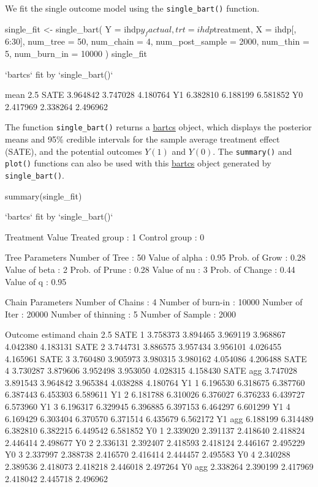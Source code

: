 We fit the single outcome model using the \verb|single_bart()| function.
\begin{example}
single_fit <- single_bart(
  Y               = ihdp$y_factual,
  trt             = ihdp$treatment,
  X               = ihdp[, 6:30],
  num_tree        = 50,
  num_chain       = 4,
  num_post_sample = 2000,
  num_thin        = 5,
  num_burn_in     = 10000
)
single_fit

`bartcs` fit by `single_bart()`

         mean     2.5%
SATE 3.964842 3.747028 4.180764
Y1   6.382810 6.188199 6.581852
Y0   2.417969 2.338264 2.496962
\end{example}
The function \verb|single_bart()| returns a \href{https://CRAN.R-project.org/package=bartcs}{bartcs} object, which displays the posterior means and 95\% credible intervals for the sample average treatment effect (SATE), and the potential outcomes $Y(1)$ and $Y(0)$. The \verb|summary()| and \verb|plot()| functions can also be used with this \href{https://CRAN.R-project.org/package=bartcs}{bartcs} object generated by \verb|single_bart()|.
\begin{example}
summary(single_fit)

`bartcs` fit by `single_bart()`

Treatment Value
  Treated group    :      1
  Control group    :      0

Tree Parameters
  Number of Tree   :     50		Value  of alpha    :   0.95
  Prob.  of Grow   :   0.28		Value  of beta     :      2
  Prob.  of Prune  :   0.28		Value  of nu       :      3
  Prob.  of Change :   0.44		Value  of q        :   0.95

Chain Parameters
  Number of Chains :      4		Number of burn-in  :  10000
  Number of Iter   :  20000		Number of thinning :      5
  Number of Sample :   2000

Outcome
 estimand chain     2.5%
      SATE    1 3.758373 3.894465 3.969119 3.968867 4.042380 4.183131
      SATE    2 3.744731 3.886575 3.957434 3.956101 4.026455 4.165961
      SATE    3 3.760480 3.905973 3.980315 3.980162 4.054086 4.206488
      SATE    4 3.730287 3.879606 3.952498 3.953050 4.028315 4.158430
      SATE  agg 3.747028 3.891543 3.964842 3.965384 4.038288 4.180764
       Y1     1 6.196530 6.318675 6.387760 6.387443 6.453303 6.589611
       Y1     2 6.181788 6.310026 6.376027 6.376233 6.439727 6.573960
       Y1     3 6.196317 6.329945 6.396885 6.397153 6.464297 6.601299
       Y1     4 6.169429 6.303404 6.370570 6.371514 6.435679 6.562172
       Y1   agg 6.188199 6.314489 6.382810 6.382215 6.449542 6.581852
       Y0     1 2.339020 2.391137 2.418640 2.418824 2.446414 2.498677
       Y0     2 2.336131 2.392407 2.418593 2.418124 2.446167 2.495229
       Y0     3 2.337997 2.388738 2.416570 2.416414 2.444457 2.495583
       Y0     4 2.340288 2.389536 2.418073 2.418218 2.446018 2.497264
       Y0   agg 2.338264 2.390199 2.417969 2.418042 2.445718 2.496962
\end{example}
